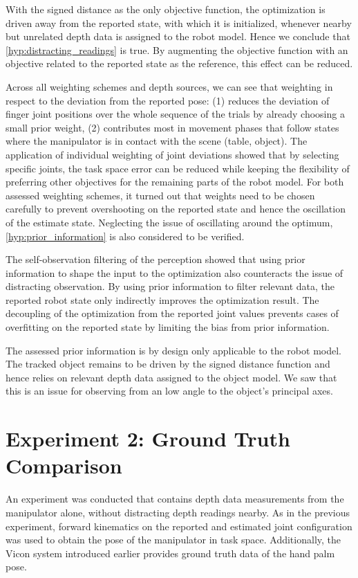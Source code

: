 With the signed distance as the only objective function, the optimization is driven away from the reported state, with which it is initialized, whenever nearby but unrelated depth data is assigned to the robot model. Hence we conclude that \cref{hyp:distracting_readings} is true. By augmenting the objective function with an objective related to the reported state as the reference, this effect can be reduced.

Across all weighting schemes and depth sources, we can see that weighting in respect to the deviation from the reported pose: (1) reduces the deviation of finger joint positions over the whole sequence of the trials by already choosing a small prior weight, (2) contributes most in movement phases that follow states where the manipulator is in contact with the scene (table, object). The application of individual weighting of joint deviations showed that by selecting specific joints, the task space error can be reduced while keeping the flexibility of preferring other objectives for the remaining parts of the robot model. For both assessed weighting schemes, it turned out that weights need to be chosen carefully to prevent overshooting on the reported state and hence the oscillation of the estimate state. Neglecting the issue of oscillating around the optimum, \cref{hyp:prior_information} is also considered to be verified.

The self-observation filtering of the perception showed that using prior information to shape the input to the optimization also counteracts the issue of distracting observation. By using prior information to filter relevant data, the reported robot state only indirectly improves the optimization result.
The decoupling of the optimization from the reported joint values prevents cases of overfitting on the reported state by limiting the bias from prior information.

The assessed prior information is by design only applicable to the robot model. The tracked object remains to be driven by the signed distance function and hence relies on relevant depth data assigned to the object model. We saw that this is an issue for observing from an low angle to the object's principal axes.


\section{Experiment 2: Ground Truth Comparison}
\label{sec:hand_pose_error}

An experiment was conducted that contains depth data measurements from the manipulator alone, without distracting depth readings nearby. As in the previous experiment, forward kinematics on the reported and estimated joint configuration was used to obtain the pose of the manipulator in task space. Additionally, the Vicon system introduced earlier provides ground truth data of the hand palm pose.


